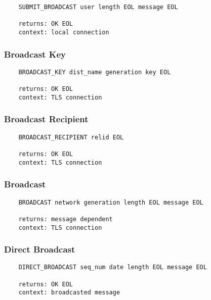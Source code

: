 \documentclass[letterpaper,11pt,oneside]{article}
\begin{document}
\vspace{10pt}
\begin{verbatim}
    SUBMIT_BROADCAST user length EOL message EOL

    returns: OK EOL
    context: local connection
\end{verbatim}
\vspace{10pt}

\subsubsection{Broadcast Key}

\vspace{10pt}
\begin{verbatim}
    BROADCAST_KEY dist_name generation key EOL

    returns: OK EOL
    context: TLS connection
\end{verbatim}
\vspace{10pt}

\subsubsection{Broadcast Recipient}

\vspace{10pt}
\begin{verbatim}
    BROADCAST_RECIPIENT relid EOL

    returns: OK EOL
    context: TLS connection
\end{verbatim}
\vspace{10pt}

\subsubsection{Broadcast}

\vspace{10pt}
\begin{verbatim}
    BROADCAST network generation length EOL message EOL

    returns: message dependent
    context: TLS connection
\end{verbatim}
\vspace{10pt}

\subsubsection{Direct Broadcast}

\vspace{10pt}
\begin{verbatim}
    DIRECT_BROADCAST seq_num date length EOL message EOL

    returns: OK EOL
    context: broadcasted message
\end{verbatim}
\end{document}
